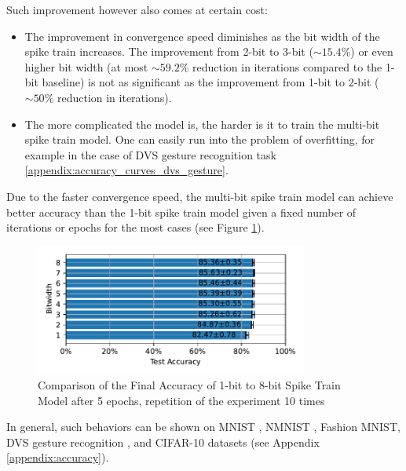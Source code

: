     Such improvement however also comes at certain cost:
    \begin{itemize}
        \item The improvement in convergence speed diminishes as the bit width of the spike train increases. The improvement from 2-bit to 3-bit ($\sim 15.4\%$) or even higher bit width (at most $\sim 59.2\%$ reduction in iterations compared to the 1-bit baseline) is not as significant as the improvement from 1-bit to 2-bit ($\sim 50\%$ reduction in iterations).
        \item The more complicated the model is, the harder is it to train the multi-bit spike train model. One can easily run into the problem of overfitting, for example in the case of DVS gesture recognition task \ref{appendix:accuracy_curves_dvs_gesture}.
    \end{itemize}

    Due to the faster convergence speed, the multi-bit spike train model can achieve better accuracy than the 1-bit spike train model given a fixed number of iterations or epochs for the most cases (see Figure \ref{fig:final_accuracy}).
    \begin{figure}[!htpb]
        \centering
        \includegraphics[width=0.8\textwidth]{../standard/FashionMNIST/plots/fashionmnist_final_acc_horizontal.pdf}
        \caption{Comparison of the Final Accuracy of 1-bit to 8-bit Spike Train Model after 5 epochs, repetition of the experiment 10 times}
        \label{fig:final_accuracy}
    \end{figure}

    In general, such behaviors can be shown on MNIST \cite{deng2012mnist}, NMNIST \cite{10.3389/fnins.2015.00437}, Fashion MNIST, DVS gesture recognition \cite{8100264}, and CIFAR-10 datasets (see Appendix \ref{appendix:accuracy}).

